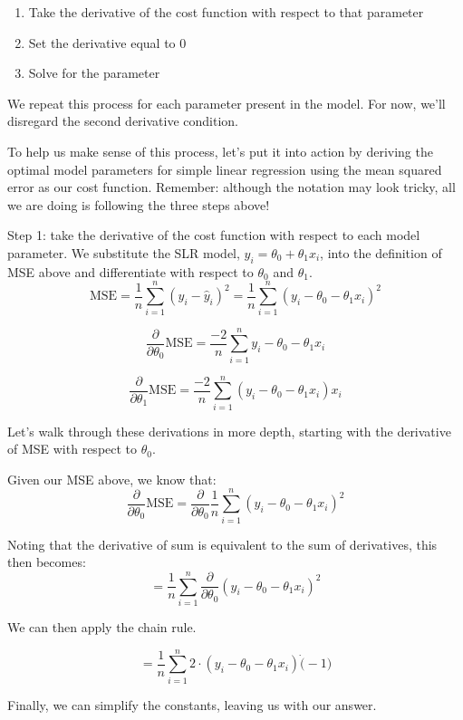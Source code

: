 \documentclass[
  letterpaper,
  DIV=11,
  numbers=noendperiod]{scrreprt}
\providecommand{\tightlist}{%
  \setlength{\itemsep}{0pt}\setlength{\parskip}{0pt}}\usepackage{longtable,booktabs,array}
\begin{document}
\begin{enumerate}
\def\labelenumi{\arabic{enumi}.}
\tightlist
\item
  Take the derivative of the cost function with respect to that
  parameter
\item
  Set the derivative equal to 0
\item
  Solve for the parameter
\end{enumerate}

We repeat this process for each parameter present in the model. For now,
we'll disregard the second derivative condition.

To help us make sense of this process, let's put it into action by
deriving the optimal model parameters for simple linear regression using
the mean squared error as our cost function. Remember: although the
notation may look tricky, all we are doing is following the three steps
above!

Step 1: take the derivative of the cost function with respect to each
model parameter. We substitute the SLR model,
\(\hat{y}_i = \theta_0+\theta_1 x_i\), into the definition of MSE above
and differentiate with respect to \(\theta_0\) and \(\theta_1\).
\[\text{MSE} = \frac{1}{n} \sum_{i=1}^{n} (y_i - \hat{y}_i)^2 = \frac{1}{n} \sum_{i=1}^{n} (y_i - \theta_0 - \theta_1 x_i)^2\]

\[\frac{\partial}{\partial \theta_0} \text{MSE} = \frac{-2}{n} \sum_{i=1}^{n} y_i - \theta_0 - \theta_1 x_i\]

\[\frac{\partial}{\partial \theta_1} \text{MSE} = \frac{-2}{n} \sum_{i=1}^{n} (y_i - \theta_0 - \theta_1 x_i)x_i\]

Let's walk through these derivations in more depth, starting with the
derivative of MSE with respect to \(\theta_0\).

Given our MSE above, we know that:
\[\frac{\partial}{\partial \theta_0} \text{MSE} = \frac{\partial}{\partial \theta_0} \frac{1}{n} \sum_{i=1}^{n} {(y_i - \theta_0 - \theta_1 x_i)}^{2}\]

Noting that the derivative of sum is equivalent to the sum of
derivatives, this then becomes:
\[ = \frac{1}{n} \sum_{i=1}^{n} \frac{\partial}{\partial \theta_0} {(y_i - \theta_0 - \theta_1 x_i)}^{2}\]

We can then apply the chain rule.

\[ = \frac{1}{n} \sum_{i=1}^{n} 2 \cdot{(y_i - \theta_0 - \theta_1 x_i)}\dot(-1)\]

Finally, we can simplify the constants, leaving us with our answer.
\end{document}
